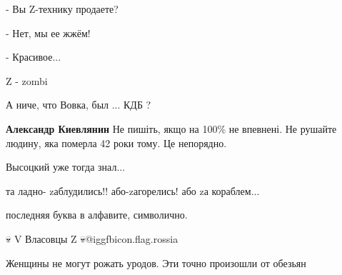 \begin{itemize}
- Вы Z-технику продаете?

- Нет, мы ее жжём!

- Красивое...

Z - zombi

А ниче, что Вовка, был ... КДБ ?

\textbf{Александр Киевлянин}
Не пишіть, якщо на 100\% не впевнені. Не рушайте людину, яка померла 42 роки тому. Це непорядно.

Высоцкий уже тогда знал...

та ладно- zаблудились!! або-zагорелись! або zа кораблем...

последняя буква в алфавите, символично.

💀 V Власовцы Z 💀@igg{fbicon.flag.rossia}

Женщины не могут рожать уродов. Эти точно произошли от обезьян

\end{itemize} %
